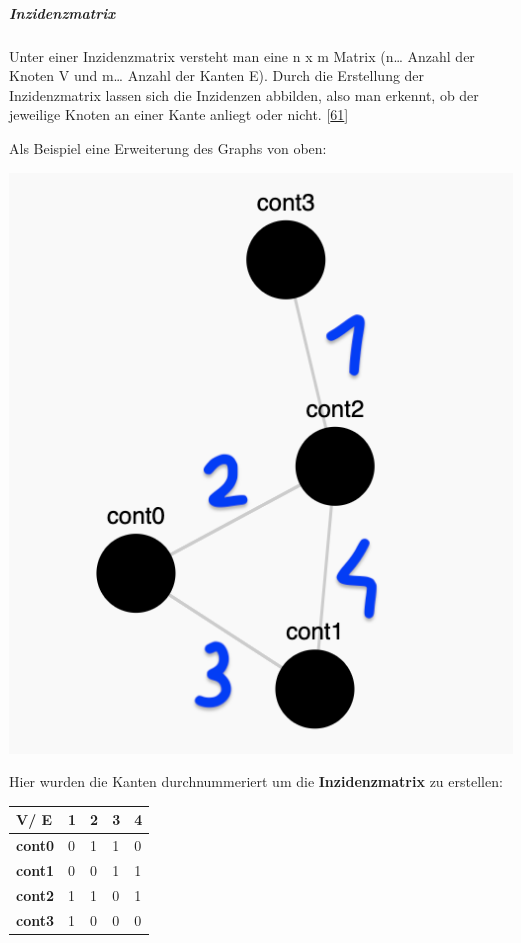 \documentclass[
    headings=optiontotocandhead,%
    twoside,
    numbers=noenddot,%
    12pt, %
    titlepage, %
    parskip=full, %
    listof=leveldown, 
    numbers=noenddot, %
    a4paper,DIV=14,
    BCOR=15mm,
]{scrbook}
\let\origfigure=\figure
\let\endorigfigure=\endfigure
\renewenvironment{figure}[1][]{%
   \origfigure[H]
}{%
   \endorigfigure
}
\begin{document}
\hypertarget{inzidenzmatrix}{%
\subparagraph{Inzidenzmatrix}\label{inzidenzmatrix}}

Unter einer Inzidenzmatrix versteht man eine n x m Matrix (n\ldots{}
Anzahl der Knoten V und m\ldots{} Anzahl der Kanten E). Durch die
Erstellung der Inzidenzmatrix lassen sich die Inzidenzen abbilden, also
man erkennt, ob der jeweilige Knoten an einer Kante anliegt oder nicht.
{[}\protect\hyperlink{ref-BWL-Lexikon-Inzidenzmatrix}{61}{]}

Als Beispiel eine Erweiterung des Graphs von oben:

\begin{figure}
\centering
\includegraphics{img/Gekle/GraphExampleExtended.png}
\caption{Nummerierung der Kanten des obrigen Graphen}
\end{figure}

Hier wurden die Kanten durchnummeriert um die \textbf{Inzidenzmatrix} zu
erstellen:

\begin{longtable}[]{@{}lllll@{}}
\toprule
\textbf{V/ E} & \textbf{1} & \textbf{2} & \textbf{3} &
\textbf{4}\tabularnewline
\midrule
\endhead
\textbf{cont0} & 0 & 1 & 1 & 0\tabularnewline
\textbf{cont1} & 0 & 0 & 1 & 1\tabularnewline
\textbf{cont2} & 1 & 1 & 0 & 1\tabularnewline
\textbf{cont3} & 1 & 0 & 0 & 0\tabularnewline
\bottomrule
\end{longtable}
\end{document}
